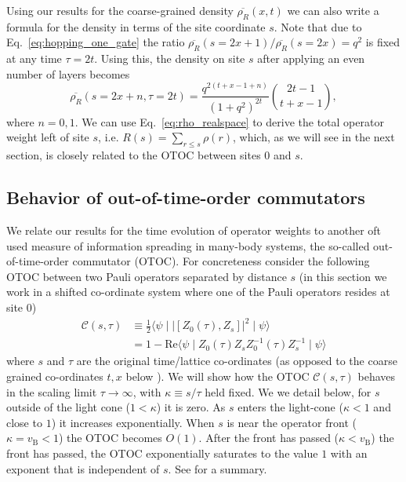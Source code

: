 \documentclass[aps,prb,twocolumn,superscriptaddress]{revtex4-1}
\begin{document}
Using our results for the coarse-grained density $\overline{\rho_R}(x,t)$ we can also write a formula for the density in terms of the site coordinate $s$. Note that due to Eq.~\eqref{eq:hopping_one_gate} the ratio $\overline{\rho_R}(s=2x+1) / \overline{\rho_R}(s=2x) = q^2$ is fixed at any time $\tau = 2t$. Using this, the density on site $s$ after applying an even number of layers becomes
\begin{equation}\label{eq:rho_realspace}
\overline{\rho_{R}}(s=2x+n,\tau = 2t) = \frac{q^{2(t+x-1+n)}}{(1+q^2)^{2t}} {2t-1 \choose t+x-1},
\end{equation}
where $n=0,1$. We can use Eq.~\eqref{eq:rho_realspace} to derive the total operator weight left of site $s$, i.e. $R(s) = \sum_{r\leq s}\rho(r)$, which, as we will see in the next section, is closely related to the OTOC between sites $0$ and $s$.



\subsection{Behavior of out-of-time-order commutators}\label{ss:randomcircuitOTOC}
We relate our results for the time evolution of operator weights to another oft used measure of information spreading in many-body systems, the so-called out-of-time-order commutator (OTOC)\cite{Shenker2014a,Shenker2014b,Shenker2015,Roberts2015,Stanford15,Maldacena2016,Hosur2016}. For concreteness consider the following OTOC between two Pauli operators separated by distance $s$ (in this section we work in a shifted co-ordinate system where one of the Pauli operators resides at site $0$)
\begin{align}\label{eq:OTOC_def}
\mathcal{C}(s,\tau) & \equiv  \frac{1}{2}\langle\psi\mid\left|\left[Z_{0}\left(\tau \right),Z_{s}\right]\right|^{2}\mid\psi\rangle \nonumber \\
 & =  1-\text{Re}\langle\psi\mid Z_{0}\left(\tau \right)Z_{s}Z_{0}^{-1}\left(\tau \right)Z_{s}^{-1}\mid\psi\rangle
\end{align}
where $s$ and $\tau$ are the original time/lattice co-ordinates (as opposed to the coarse grained co-ordinates $t,x$ below ). We will show how the OTOC $\mathcal{C}(s,\tau) $ behaves in the scaling limit $\tau\rightarrow \infty$, with $\kappa \equiv s/\tau$ held fixed. We we detail below, for $s$ outside of the light cone ($1<\kappa$) it is zero. As $s$ enters the light-cone ($\kappa<1$  and close to $1$) it increases exponentially.   When $s$ is near the operator front ($\kappa = v_{\text{B}}<1$) the OTOC becomes $O(1)$. After the front has passed ($\kappa < v_{\text{B}}$) the front has passed, the OTOC exponentially saturates to the value $1$ with an exponent that is independent of $s$. See  for a summary. 
\end{document}
